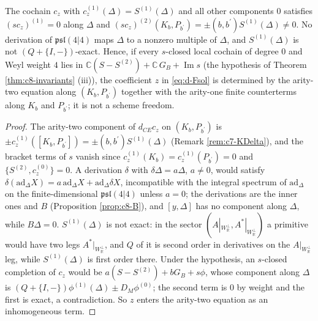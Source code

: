 \begin{proposition}
\label{prop:d-z}
The cochain $c_z$ with $c_z^{(1)}(\Delta)=S^{(1)}(\Delta)$ and all other components $0$ satisfies $(sc_z)^{(1)}=0$ along $\Delta$ and $(sc_z)^{(2)}(K_b,P_{b^{\prime}})=\pm(b,b^{\prime})S^{(1)}(\Delta)\neq0$. No derivation of $\mathfrak{psl}(4|4)$ maps $\Delta$ to a nonzero multiple of $\Delta$, and $S^{(1)}(\Delta)$ is not $(Q+\{I,-\})$-exact. Hence, if every $s$-closed local cochain of degree $0$ and Weyl weight $4$ lies in $\mathbb C(S-S^{(2)})+\mathbb C\,G_B+\operatorname{Im}s$ (the hypothesis of Theorem \ref{thm:c8-invariants} (iii)), the coefficient $z$ in \eqref{eq:d-Fsol} is determined by the arity-two equation along $(K_b,P_{b^{\prime}})$ together with the arity-one finite counterterms along $K_b$ and $P_{b^{\prime}}$; it is not a scheme freedom.
\end{proposition}

\begin{proof}
The arity-two component of $d_{CE}c_z$ on $(K_b,P_{b^{\prime}})$ is $\pm c_z^{(1)}([K_b,P_{b^{\prime}}])=\pm(b,b^{\prime})S^{(1)}(\Delta)$ (Remark \ref{rem:c7-KDelta}), and the bracket terms of $s$ vanish since $c_z^{(1)}(K_b)=c_z^{(1)}(P_{b^{\prime}})=0$ and $\{S^{(2)},c_z^{(0)}\}=0$. A derivation $\delta$ with $\delta\Delta=a\Delta$, $a\neq0$, would satisfy $\delta(\mathrm{ad}_\Delta X)=a\,\mathrm{ad}_\Delta X+\mathrm{ad}_\Delta\delta X$, incompatible with the integral spectrum of $\mathrm{ad}_\Delta$ on the finite-dimensional $\mathfrak{psl}(4|4)$ unless $a=0$; the derivations are the inner ones and $B$ (Proposition \ref{prop:c8-B}), and $[y,\Delta]$ has no component along $\Delta$, while $B\Delta=0$. $S^{(1)}(\Delta)$ is not exact: in the sector $(A|_{W_{\mathbb R}^\perp},A^*|_{W_{\mathbb R}^\perp})$ a primitive would have two legs $A^*|_{W_{\mathbb R}^\perp}$, and $Q$ of it is second order in derivatives on the $A|_{W_{\mathbb R}^\perp}$ leg, while $S^{(1)}(\Delta)$ is first order there. Under the hypothesis, an $s$-closed completion of $c_z$ would be $a(S-S^{(2)})+bG_B+s\phi$, whose component along $\Delta$ is $(Q+\{I,-\})\phi^{(1)}(\Delta)\pm D_M\phi^{(0)}$; the second term is $0$ by weight and the first is exact, a contradiction. So $z$ enters the arity-two equation as an inhomogeneous term.
\end{proof}


